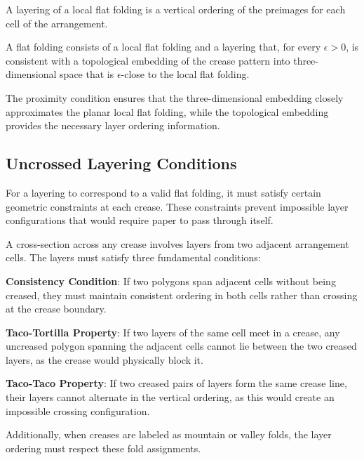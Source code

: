 \begin{definition}[Layering]
A layering of a local flat folding is a vertical ordering of the preimages for each cell of the arrangement.
\end{definition}

\begin{definition}
A flat folding consists of a local flat folding and a layering that, for every $\epsilon > 0$, is consistent with a topological embedding of the crease pattern into three-dimensional space that is $\epsilon$-close to the local flat folding.
\end{definition}

The proximity condition ensures that the three-dimensional embedding closely approximates the planar local flat folding, while the topological embedding provides the necessary layer ordering information.

\subsection{Uncrossed Layering Conditions}

For a layering to correspond to a valid flat folding, it must satisfy certain geometric constraints at each crease. These constraints prevent impossible layer configurations that would require paper to pass through itself.

A cross-section across any crease involves layers from two adjacent arrangement cells. The layers must satisfy three fundamental conditions:

\textbf{Consistency Condition}: If two polygons span adjacent cells without being creased, they must maintain consistent ordering in both cells rather than crossing at the crease boundary.

\textbf{Taco-Tortilla Property}: If two layers of the same cell meet in a crease, any uncreased polygon spanning the adjacent cells cannot lie between the two creased layers, as the crease would physically block it.

\textbf{Taco-Taco Property}: If two creased pairs of layers form the same crease line, their layers cannot alternate in the vertical ordering, as this would create an impossible crossing configuration.

Additionally, when creases are labeled as mountain or valley folds, the layer ordering must respect these fold assignments.

